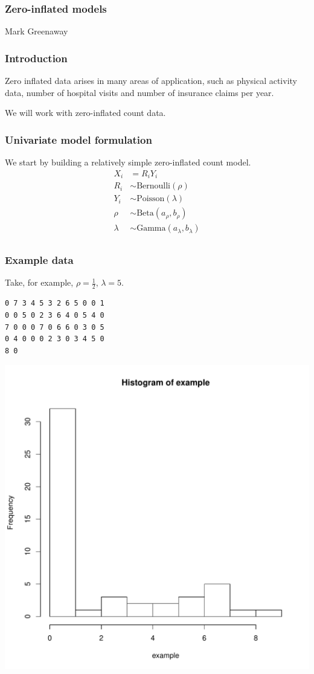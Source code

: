 \documentclass{beamer}
\begin{document}
\begin{frame}
\frametitle{Zero-inflated models}
Mark Greenaway
\end{frame}

\begin{frame}
\frametitle{Introduction}
Zero inflated data arises in many areas of application, such as physical
activity data, number of hospital visits and number of insurance claims per
year.

We will work with zero-inflated count data.
\end{frame}

\begin{frame}
\frametitle{Univariate model formulation}
We start by building a relatively simple zero-inflated count model.
\begin{align*}
X_i &= R_i Y_i \\
R_i &\sim \text{Bernoulli}(\rho) \\
Y_i &\sim \text{Poisson}(\lambda) \\
\rho &\sim \text{Beta}(a_\rho, b_\rho) \\
\lambda &\sim \text{Gamma}(a_\lambda, b_\lambda) \\
\end{align*}
\end{frame}

\begin{frame}
\frametitle{Example data}
Take, for example, $\rho = \frac{1}{2}$, $\lambda = 5$.
\begin{verbatim}
0 7 3 4 5 3 2 6 5 0 0 1
0 0 5 0 2 3 6 4 0 5 4 0
7 0 0 0 7 0 6 6 0 3 0 5
0 4 0 0 0 2 3 0 3 4 5 0
8 0
\end{verbatim}
\includegraphics{code/univariate_data_histogram.pdf}
\end{frame}
\end{document}

